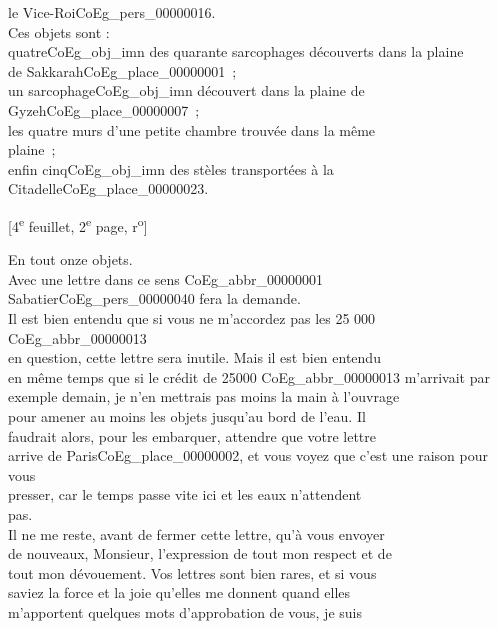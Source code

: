\documentclass{book}
\begin{document}
le Vice-Roi\gls{CoEg_pers_00000016}.\\
\indent Ces objets sont :\\
\indent quatre\gls{CoEg_obj_imn} des quarante sarcophages découverts dans la plaine\\
de Sakkarah\gls{CoEg_place_00000001}~;\\
\indent un sarcophage\gls{CoEg_obj_imn} découvert dans la plaine de Gyzeh\gls{CoEg_place_00000007}~;\\
\indent les quatre murs d’une petite chambre trouvée dans la même\\
plaine~;\\
\indent enfin cinq\gls{CoEg_obj_imn} des stèles transportées à la Citadelle\gls{CoEg_place_00000023}.
{\footnotesize\begin{center} {[4\textsuperscript{e} feuillet, 2\textsuperscript{e} page, r\textsuperscript{o}]}\end{center}}
\indent En tout onze objets.\\
\indent Avec une lettre dans ce sens \gls{CoEg_abbr_00000001} Sabatier\gls{CoEg_pers_00000040} fera la demande.\\
\indent Il est bien entendu que si vous ne m’accordez pas les 25 000 \gls{CoEg_abbr_00000013}\\
en question, cette lettre sera inutile. Mais il est bien entendu\\
en même temps que si le crédit de 25000 \gls{CoEg_abbr_00000013} m’arrivait par\\
exemple demain, je n’en mettrais pas moins la main à l’ouvrage\\
pour amener au moins les objets jusqu’au bord de l’eau. Il\\
faudrait alors, pour les embarquer, attendre que votre lettre\\
arrive de Paris\gls{CoEg_place_00000002}, et vous voyez que c’est une raison pour vous\\
presser, car le temps passe vite ici et les eaux n’attendent\\
pas.\\
\indent Il ne me reste, avant de fermer cette lettre, qu’à vous envoyer\\
de nouveaux, Monsieur, l’expression de tout mon respect et de\\
tout mon dévouement. Vos lettres sont bien rares, et si vous\\
saviez la force et la joie qu’elles me donnent quand elles\\
m’apportent quelques mots d’approbation de vous, je suis\\
\end{document}
